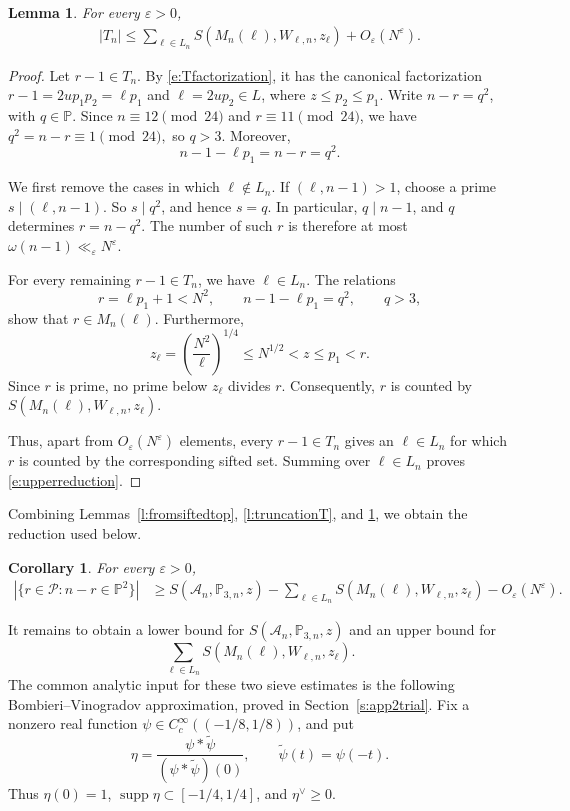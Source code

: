 \documentclass[12pt,reqno]{amsart}
\numberwithin{equation}{section}
\newtheorem{lemma}[equation]{Lemma}
\newtheorem{corollary}[equation]{Corollary}
\theoremstyle{definition}
\theoremstyle{remark}
\begin{document}
\begin{lemma}\label{l:upperreduction}
For every $\varepsilon>0$,
\begin{align}\label{e:upperreduction}
 |T_n|
 \leq\sum_{\ell\in L_n}
 S(M_n(\ell),W_{\ell,n},z_\ell)+O_\varepsilon(N^\varepsilon).
\end{align}
\end{lemma}

\begin{proof}
Let \(r-1\in T_n\).  By \eqref{e:Tfactorization}, it has the canonical
factorization $r-1=2up_1p_2=\ell p_1$ and $\ell=2up_2\in L$,
where \(z\leq p_2\leq p_1\).  Write \(n-r=q^2\), with
\(q\in\mathbb P\).  Since \(n\equiv12\pmod{24}\) and
\(r\equiv11\pmod{24}\), we have $q^2=n-r\equiv1\pmod{24},$
so \(q>3\).  Moreover,
\[
 n-1-\ell p_1=n-r=q^2.
\]

We first remove the cases in which \(\ell\notin L_n\).  If
\((\ell,n-1)>1\), choose a prime \(s\mid(\ell,n-1)\). So $s\mid q^2$, 
and hence \(s=q\).  In particular, \(q\mid n-1\), and \(q\) determines
\(r=n-q^2\).  The number of such \(r\) is therefore at most $\omega(n-1)\ll_\varepsilon N^\varepsilon.$


For every remaining \(r-1\in T_n\), we have \(\ell\in L_n\).  The
relations
\[
 r=\ell p_1+1<N^2,
 \qquad
 n-1-\ell p_1=q^2,
 \qquad q>3,
\]
show that \(r\in M_n(\ell)\).  Furthermore,
\[
 z_\ell=\left(\frac{N^2}{\ell}\right)^{1/4}
 \leq N^{1/2}<z\leq p_1<r.
\]
Since \(r\) is prime, no prime below \(z_\ell\) divides \(r\).
Consequently, \(r\) is counted by
\(S(M_n(\ell),W_{\ell,n},z_\ell)\).

Thus, apart from \(O_\varepsilon(N^\varepsilon)\) elements, every
\(r-1\in T_n\) gives an \(\ell\in L_n\) for which \(r\) is counted by
the corresponding sifted set.  Summing over \(\ell\in L_n\) proves
\eqref{e:upperreduction}.
\end{proof}

Combining Lemmas~\ref{l:fromsiftedtop}, \ref{l:truncationT}, and
\ref{l:upperreduction}, we obtain the reduction used below.

\begin{corollary}\label{c:mastersievereduction}
For every $\varepsilon>0$,
\begin{align}\label{e:mastersievereduction}
 |\{r\in\mathcal P:n-r\in\mathbb P^2\}|
 &\geq S(\mathcal A_n,\mathbb P_{3,n},z)-\sum_{\ell\in L_n}
 S(M_n(\ell),W_{\ell,n},z_\ell)
 -O_\varepsilon(N^\varepsilon).
\end{align}
\end{corollary}
It remains to obtain a lower bound for
\(S(\mathcal A_n,\mathbb P_{3,n},z)\) and an upper bound for 
$$ \sum_{\ell\in L_n}S(M_n(\ell),W_{\ell,n},z_\ell).$$
The common analytic input for these two sieve estimates is the following
Bombieri--Vinogradov approximation, proved in
Section~\ref{s:app2trial}.
Fix a nonzero real function
\(\psi\in C_c^\infty((-1/8,1/8))\), and put
\[
 \eta=\frac{\psi*\widetilde\psi}{(\psi*\widetilde\psi)(0)},
 \qquad
 \widetilde\psi(t)=\psi(-t).
\]
Thus \(\eta(0)=1\), \(\operatorname{supp}\eta\subset[-1/4,1/4]\), and
\(\eta^\vee\geq0\).
\end{document}
